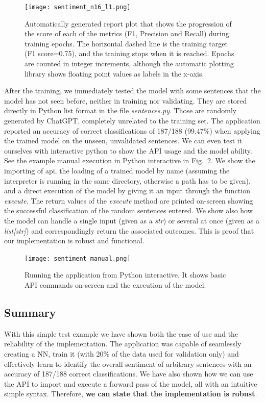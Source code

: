 \documentclass[a4paper, 11pt]{report}
\begin{document}
 \begin{figure}[ht!]
     \centering
     \texttt{[image: sentiment\_n16\_l1.png]}\\
     \caption[Plotted report on training]{Automatically generated report plot that shows the progression of the score of each of the metrics (F1, Precision and Recall) during training epochs. The horizontal dashed line is the training target (F1 score=0.75), and the training stops when it is reached. Epochs are counted in integer increments, although the automatic plotting library shows floating point values as labels in the x-axis.}
     \label{fig: autoplot_report}
 \end{figure}

After the training, we immediately tested the model with some sentences that the model has not seen before, neither in training nor validating. They are stored directly in Python list format in the file \textit{sentences.py}. Those are randomly generated by ChatGPT, completely unrelated to the training set. The application reported an accuracy of correct classifications of 187/188 (99.47\%)  when applying the trained model on the unseen, unvalidated sentences. We can even test it ourselves with interactive python to show the API usage and the model ability. See the example manual execution in Python interactive in Fig.~\ref{fig: sentiment_manual}.  We show the importing of api, the loading of a trained model by name (assuming the interpreter is running in the same directory, otherwise a path has to be given), and a direct execution of the model by giving it an input through the function \textit{execute}. The return values of the \textit{execute} method are printed on-screen showing the successful classification of the random sentences entered. We show also how the model can handle a single input (given as a \textit{str}) or several at once (given as a \textit{list[str]}) and correspondingly return the associated outcomes. This is proof that our implementation is robust and functional.

\begin{figure}[ht!]
    \centering
    \texttt{[image: sentiment\_manual.png]}
    \caption[Example running on Python Interactive]{Running the application from Python interactive. It shows basic API commands on-screen and the execution of the model.}
    \label{fig: sentiment_manual}
\end{figure}

\subsection{Summary}
With this simple test example we have shown both the ease of use and the reliability of the implementation. The application was capable of seamlessly creating a NN, train it (with 20\% of the data used for validation only) and effectively learn to identify the overall sentiment of arbitrary sentences with an accuracy of 187/188 correct classifications. We have also shown how we can use the API to import and execute a forward pass of the model, all with an intuitive simple syntax. Therefore, \textbf{we can state that the implementation is robust}.
\end{document}
